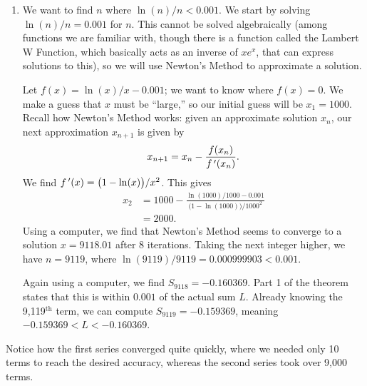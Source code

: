 {\begin{enumerate}
	\item		We want to find $n$ where $\ln (n)/n < 0.001$. We start by solving $\ln (n)/n = 0.001$ for $n$. This cannot be solved algebraically (among functions we are familiar with, though there is a function called the Lambert W Function, which basically acts as an inverse of $xe^x$, that can express solutions to this), so we will use Newton's Method to approximate a solution. 
	
	Let $f(x) = \ln(x)/x-0.001$; we want to know where $f(x) = 0$. We make a guess that $x$ must be ``large,'' so our initial guess will be $x_1=1000$. Recall how Newton's Method works: given an approximate solution $x_n$, our next approximation $x_{n+1}$ is given by
	$$x_{n+1} = x_n - \frac{f(x_n)}{f\,'(x_n)}.$$
	We find $f\,'(x) = \big(1-\ln(x)\big)/x^2$. This gives
	\begin{align*}
	x_2 &= 1000 - \frac{\ln(1000)/1000-0.001}{\big(1-\ln(1000)\big)/1000^2} \\
			&= 2000.
	\end{align*}
	Using a computer, we find that Newton's Method seems to converge to a solution $x=9118.01$ after 8 iterations. Taking the next integer higher, we have $n=9119$, where $\ln(9119)/9119 =0.000999903<0.001$.
	
	Again using a computer, we find $S_{9118} = -0.160369$. Part 1 of the theorem states that this is within $0.001$ of the actual sum $L$. Already knowing the 9,119$^\text{th}$ term, we can compute $S_{9119} = -0.159369$, meaning $-0.159369 < L < -0.160369$. 
	
\end{enumerate}
Notice how the first series converged quite quickly, where we needed only 10 terms to reach the desired accuracy, whereas the second series took over 9,000 terms.
}\\

